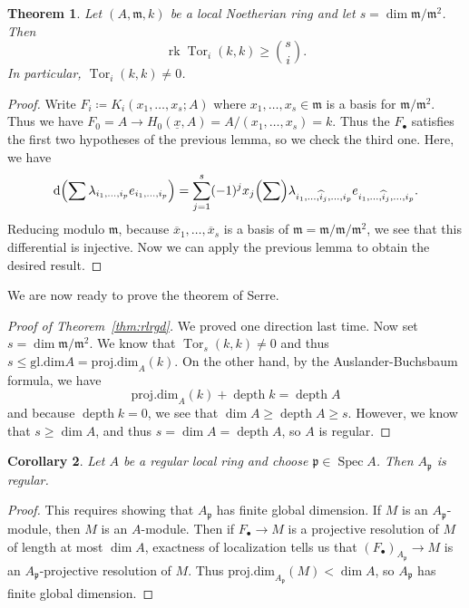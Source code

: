 \documentclass[leqno, openany]{memoir}
\newtheorem{thm}{Theorem}[section]
\newtheorem{cor}[thm]{Corollary}
\theoremstyle{definition}
\theoremstyle{remark}
\theoremstyle{plain}
\theoremstyle{definition}
\theoremstyle{remark}
\newcommand{\mf}[1]{\mathfrak{#1}}
\newcommand{\mr}[1]{\mathrm{#1}}
\newcommand{\ol}[1]{\overline{#1}}
\newcommand{\ul}[1]{\underline{#1}}
\newcommand{\wh}[1]{\widehat{#1}}
\DeclareMathOperator{\Spec}{Spec}
\DeclareMathOperator{\Tor}{Tor}
\DeclareMathOperator{\dpth}{depth}
\begin{document}
\begin{thm} Let $(A, \mf{m}, k)$ be a local Noetherian ring and let $s = \dim
    \mf{m} / \mf{m}^2$. Then \[ \operatorname{rk} \Tor_i(k,k) \geq
    \binom{s}{i}. \] In particular, $\Tor_i(k, k) \neq 0$.  \end{thm}

\begin{proof} Write $F_i \coloneqq K_i(x_1, \ldots, x_s; A)$ where $x_1,
    \ldots, x_s \in \mf{m}$ is a basis for $\mf{m} / \mf{m}^2$. Thus we have
    $F_0 = A \to H_0(\ul{x}, A) = A/(x_1, \ldots, x_s) = k$. Thus the
    $F_{\bullet}$ satisfies the first two hypotheses of the previous lemma, so
    we check the third one. Here, we have \[ \dd \qty(\sum \lambda_{i_1,
    \ldots, i_p} e_{i_1, \ldots, i_p}) = \sum_{j=1}^s (-1)^j x_j \qty(\sum)
\lambda_{i_1, \ldots, \wh{i}_j, \ldots, i_p} e_{i_1, \ldots, \wh{i}_j, \ldots,
i_p}. \] Reducing modulo $\mf{m}$, because $\ol{x}_1, \ldots, \ol{x}_s$ is a
basis of $\mf{m} = \mf{m} / \mf{m}/\mf{m}^2$, we see that this differential is
injective. Now we can apply the previous lemma to obtain the desired result.
\end{proof}

We are now ready to prove the theorem of Serre.

\begin{proof}[Proof of Theorem~\ref{thm:rlrgd}] We proved one direction last
    time. Now set $s = \dim \mf{m} / \mf{m}^2$. We know that $\Tor_s(k,k) \neq
    0$ and thus $s \leq \mr{gl.dim} A = \mr{proj.dim}_A(k)$. On the other hand,
    by the Auslander-Buchsbaum formula, we have \[ \mr{proj.dim}_A(k) + \dpth k
    = \dpth A \] and because $\dpth k = 0$, we see that $\dim A \geq \dpth A
    \geq s$. However, we know that $s \geq \dim A$, and thus $s = \dim A =
    \dpth A$, so $A$ is regular.  \end{proof}

\begin{cor} Let $A$ be a regular local ring and choose $\mf{p} \in \Spec A$.
Then $A_{\mf{p}}$ is regular.  \end{cor}

\begin{proof} This requires showing that $A_{\mf{p}}$ has finite global
    dimension. If $M$ is an $A_{\mf{p}}$-module, then $M$ is an $A$-module.
    Then if $F_{\bullet} \to M$ is a projective resolution of $M$ of length at
    most $\dim A$, exactness of localization tells us that
    $(F_{\bullet})_{A_{\mf{p}}} \to M$ is an $A_{\mf{p}}$-projective resolution
    of $M$. Thus $\mr{proj.dim}_{A_{\mf{p}}}(M) < \dim A$, so $A_{\mf{p}}$ has
    finite global dimension.  \end{proof}
\end{document}
